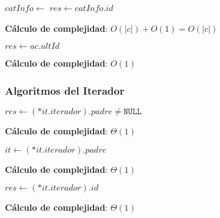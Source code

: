 \documentclass[10pt, a4paper]{article}
\let\TipoVariable=\texttt
\let\ModificadorArgumento=\textbf
\newcommand{\In}[2]{\ModificadorArgumento{in} \ensuremath{#1}\,: \TipoVariable{#2}\xspace}
\newcommand{\Inout}[2]{\ModificadorArgumento{in/out} \ensuremath{#1}\,: \TipoVariable{#2}\xspace}
\newcommand{\DRef}{\ensuremath{\rightarrow}}
\begin{document}
\begin{algorithm}[H]
\caption*{iID(\In{ac}{abCat}, \In{c}{categoria}) $\DRef res$ : \TipoVariable{Nat}}
\begin{algorithmic}[1]
	\State $catInfo \gets$ 
	\State $res \gets catInfo.id$
\end{algorithmic}
\textbf{C\'alculo de complejidad}: $O(|c|) + O(1) = O(|c|)$
\end{algorithm}

\begin{algorithm}[H]
\caption*{iCantCategorias(\In{ac}{abCat}) $\DRef res$ : \TipoVariable{Nat}}
\begin{algorithmic}[1]
	\State $res \gets ac.ultId$
\end{algorithmic}
\textbf{C\'alculo de complejidad}: $O(1)$
\end{algorithm}

\subsubsection{Algoritmos del Iterador}

\begin{algorithm}[H]
\caption*{iHayMasPadres?(\In{it}{itAbCat}) $\DRef res$ : \TipoVariable{Bool}}
\begin{algorithmic}[1]
	\State $res \gets (*it.iterador).padre \neq \TipoVariable{NULL}$
\end{algorithmic}
	\textbf{C\'alculo de complejidad}: $\Theta(1)$
\end{algorithm}

\begin{algorithm}[H]
\caption*{iSubir(\Inout{it}{itAbCat})}
\begin{algorithmic}[1]
	\State $it \gets (*it.iterador).padre$ 
\end{algorithmic}
	\textbf{C\'alculo de complejidad}: $\Theta(1)$
\end{algorithm}

\begin{algorithm}[H]
\caption*{iActualID(\In{it}{itAbCat}) $\DRef res$ : \TipoVariable{Nat}}
\begin{algorithmic}[1]
	\State $res \gets (*it.iterador).id$ 
\end{algorithmic}
	\textbf{C\'alculo de complejidad}: $\Theta(1)$
\end{algorithm}
\end{document}
